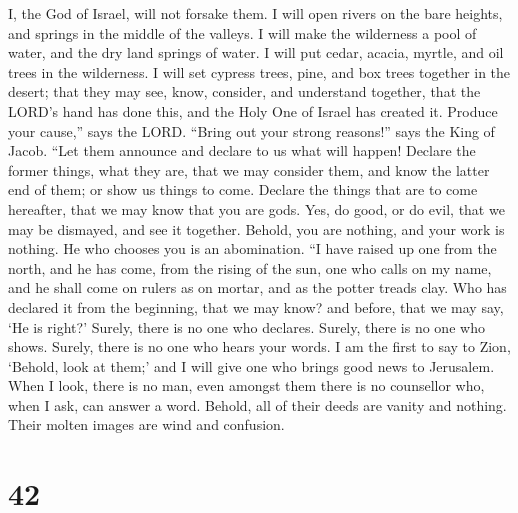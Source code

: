 I, the God of Israel, will not forsake them.  I will open
rivers on the bare heights, and springs in the middle of the valleys. I
will make the wilderness a pool of water, and the dry land springs of
water.  I will put cedar, acacia, myrtle, and oil trees
in the wilderness. I will set cypress trees, pine, and box trees
together in the desert;  that they may see, know,
consider, and understand together, that the LORD's hand has done this,
and the Holy One of Israel has created it.  Produce your
cause,'' says the LORD. ``Bring out your strong reasons!'' says the King
of Jacob.  ``Let them announce and declare to us what
will happen! Declare the former things, what they are, that we may
consider them, and know the latter end of them; or show us things to
come.  Declare the things that are to come hereafter,
that we may know that you are gods. Yes, do good, or do evil, that we
may be dismayed, and see it together.  Behold, you are
nothing, and your work is nothing. He who chooses you is an abomination.
 ``I have raised up one from the north, and he has come,
from the rising of the sun, one who calls on my name, and he shall come
on rulers as on mortar, and as the potter treads clay. 
Who has declared it from the beginning, that we may know? and before,
that we may say, `He is right?' Surely, there is no one who declares.
Surely, there is no one who shows. Surely, there is no one who hears
your words.  I am the first to say to Zion, `Behold, look
at them;' and I will give one who brings good news to Jerusalem.
 When I look, there is no man, even amongst them there is
no counsellor who, when I ask, can answer a word. 
Behold, all of their deeds are vanity and nothing. Their molten images
are wind and confusion.

\hypertarget{section-41}{%
\section{42}\label{section-41}}

